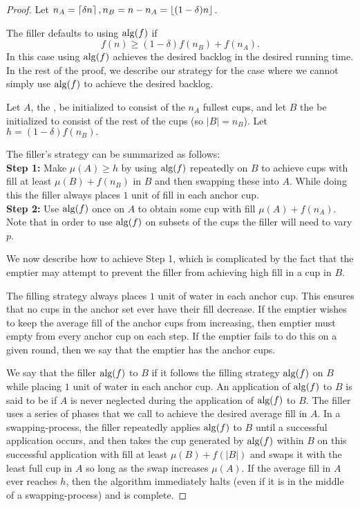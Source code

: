 \begin{proof}
  Let $n_A = \left\lceil \delta n \right\rceil, n_B = n-n_A = \left\lfloor (1-\delta) n \right\rfloor$.

  The filler defaults to using $\operatorname{\text{\textup{alg}}}(f)$ if 
  $$f(n) \ge (1-\delta)f(n_B) + f(n_A).$$ 
  In this case using $\operatorname{\text{\textup{alg}}}(f)$ achieves the desired backlog in
  the desired running time. In the rest of the proof, we describe
  our strategy for the case where we cannot simply use $\operatorname{\text{\textup{alg}}}(f)$ to
  achieve the desired backlog. 

  Let $A$, the , be initialized to consist of
  the $n_A$ fullest cups, and let $B$ the
   be initialized to consist of the rest of
  the cups (so $|B| = n_B$). Let $h = (1-\delta)f(n_B).$

  The filler's strategy can be summarized as follows: \\
  \textbf{Step 1:} Make $\mu(A) \ge h$ by using $\operatorname{\text{\textup{alg}}}(f)$
  repeatedly on $B$ to achieve cups with fill at least $\mu(B) +
  f(n_B)$ in $B$ and then swapping these into $A$. While doing
  this the filler always places $1$ unit of fill in each anchor
  cup.\\
  \textbf{Step 2:} Use $\operatorname{\text{\textup{alg}}}(f)$ once on $A$ to obtain some cup
  with fill $\mu(A)+f(n_A)$.\\
  Note that in order to use $\operatorname{\text{\textup{alg}}}(f)$ on subsets of the cups the
  filler will need to vary $p$.

  We now describe how to achieve Step 1, which is
  complicated by the fact that the emptier may attempt to
  prevent the filler from achieving high fill in a cup
  in $B$.

  The filling strategy always places $1$ unit of water in each
  anchor cup. This ensures that no cups in the anchor set ever
  have their fill decrease. If the emptier wishes to keep the
  average fill of the anchor cups from increasing, then emptier
  must empty from every anchor cup on each step. If the emptier
  fails to do this on a given round, then we say that the emptier
  has  the anchor cups. 

  We say that the filler  $\operatorname{\text{\textup{alg}}}(f)$ to $B$ if it
  follows the filling strategy $\operatorname{\text{\textup{alg}}}(f)$ on $B$ while placing $1$
  unit of water in each anchor cup. An application of $\operatorname{\text{\textup{alg}}}(f)$
  to $B$ is said to be  if $A$ is never
  neglected during the application of $\operatorname{\text{\textup{alg}}}(f)$ to $B$. The
  filler uses a series of phases that we call
   to achieve the desired average fill
  in $A$. In a swapping-process, the filler repeatedly applies
  $\operatorname{\text{\textup{alg}}}(f)$ to $B$ until a successful application occurs, and
  then takes the cup generated by $\operatorname{\text{\textup{alg}}}(f)$ within $B$ on this
  successful application with fill at least $\mu(B) + f(|B|)$ and
  swaps it with the least full cup in $A$ so long as the swap
  increases $\mu(A)$. If the average fill in $A$ ever
  reaches $h$, then the algorithm immediately halts (even if it
  is in the middle of a swapping-process) and is complete.


\end{proof}

